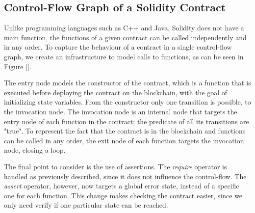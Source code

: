 
\subsection{Control-Flow Graph of a Solidity Contract} \label{cfg_con}

Unlike programming languages such as C++ and Java, Solidity does not have a main function, the functions of a given contract can be called independently and in any order. To capture the behaviour of a contract in a single control-flow graph, we create an infrastructure to model calls to functions, as can be seen in Figure \ref{}.

The entry node models the constructor of the contract, which is a function that is executed before deploying the contract on the blockchain, with the goal of initializing state variables. From the constructor only one transition is possible, to the invocation node. The invocation node is an internal node that targets the entry node of each function in the contract; the predicate of all its transitions are "true". To represent the fact that the contract is in the blockchain and functions can be called in any order, the exit node of each function targets the invocation node, closing a loop.

The final point to consider is the use of assertions. The \textit{require} operator is handled as previously described, since it does not influence the control-flow. The \textit{assert} operator, however, now targets a global error state, instead of a specific one for each function. This change makes checking the contract easier, since we only need verify if one particular state can be reached. 